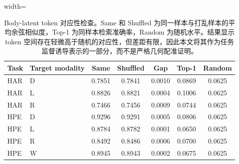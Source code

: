 \begin{table}[!htbp]
\centering
\caption{Body-latent token 对应性检查。Same 和 Shuffled 为同一样本与打乱样本的平均余弦相似度，Top-1 为同样本检索准确率，Random 为随机水平。结果显示 token 空间存在轻微高于随机的对应性，但差距有限，因此本文将其作为任务监督诱导表示的一部分，而不是严格几何配准证明。}
\label{tab:body_latent_cn}
\scriptsize
\begin{adjustbox}{width=\textwidth}
\begin{tabular}{llccccc}
\toprule
Task & Target modality & Same & Shuffled & Gap & Top-1 & Random \\
\midrule
HAR & D & 0.7851 & 0.7841 & 0.0010 & 0.0869 & 0.0625 \\
HAR & L & 0.8826 & 0.8821 & 0.0004 & 0.1006 & 0.0625 \\
HAR & R & 0.7466 & 0.7456 & 0.0009 & 0.0744 & 0.0625 \\
\midrule
HPE & D & 0.9296 & 0.9291 & 0.0005 & 0.0806 & 0.0625 \\
HPE & L & 0.8784 & 0.8782 & 0.0001 & 0.0650 & 0.0625 \\
HPE & R & 0.8492 & 0.8486 & 0.0006 & 0.0700 & 0.0625 \\
HPE & W & 0.8945 & 0.8943 & 0.0002 & 0.0675 & 0.0625 \\
\bottomrule
\end{tabular}
\end{adjustbox}
\end{table}

